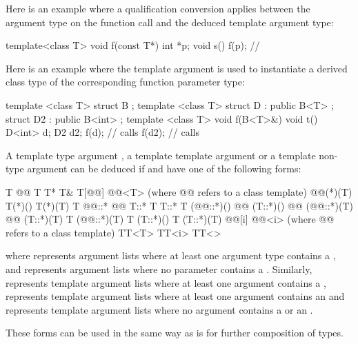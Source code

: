 \pnum
Here is an example where a qualification conversion applies between the
argument type on the function call and the deduced template argument type:

\begin{codeblock}
template<class T> void f(const T*) {}
int *p;
void s()
{
	f(p);			// 
}
\end{codeblock}

\pnum
Here is an example where the template argument is used to instantiate
a derived class type of the corresponding function parameter type:

\begin{codeblock}
template <class T> struct B { };
template <class T> struct D : public B<T> {};
struct D2 : public B<int> {};
template <class T> void f(B<T>&){}
void t()
{
	D<int> d;
	D2     d2;
	f(d);			// calls 
	f(d2);			// calls 
}
\end{codeblock}
\exitexampleb

\pnum
A template type argument
,
a template template argument
or a template non-type argument
can be deduced if
and
have one of the following forms:

\begin{codeblock}
T
@@ T
T*
T&
T[@@]
@@<T>  (where @@ refers to a class template)
@@(*)(T)
T(*)()
T(*)(T)
T @@::*
@@ T::*
T T::*
T (@@::*)()
@@ (T::*)()
@@ (@@::*)(T)
@@ (T::*)(T)
T (@@::*)(T)
T (T::*)()
T (T::*)(T)
@@[i]
@@<i>  (where @@ refers to a class template)
TT<T>
TT<i>
TT<>
\end{codeblock}

where
represents argument lists where at least one argument type contains a
,
and
\tcode{()}
represents argument lists where no parameter contains a
.
Similarly,
represents template argument lists where at least one argument contains a
,
represents template argument lists where at least one argument contains an
and
\tcode{<>}
represents template argument lists where no argument contains a
or an
.

\pnum
These forms can be used in the same way as
is for further composition of types.
\enterexample

